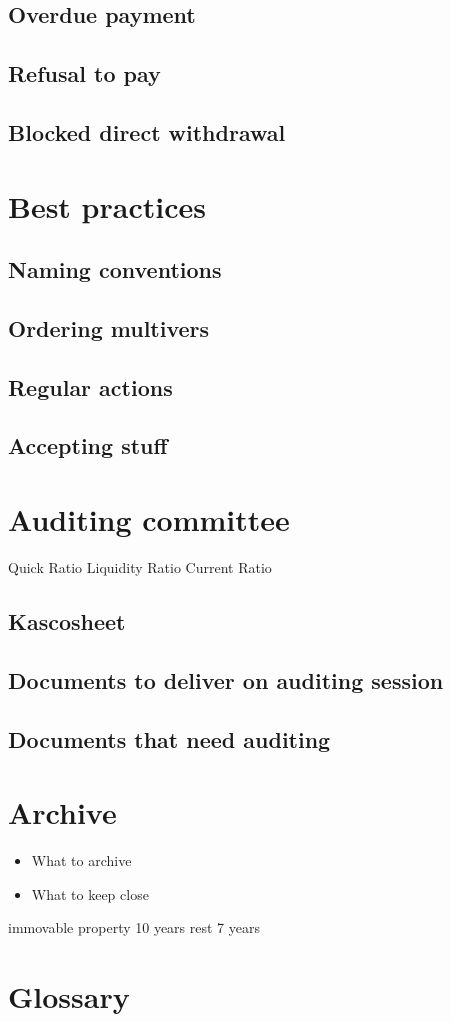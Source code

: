 \documentclass{report}
\begin{document}
\subsection{Overdue payment}
\subsection{Refusal to pay}
\subsection{Blocked direct withdrawal}
\section{Best practices}
\subsection{Naming conventions}
\subsection{Ordering multivers}
\subsection{Regular actions}
\subsection{Accepting stuff}
\section{Auditing committee}
Quick Ratio
Liquidity Ratio
Current Ratio
\subsection{Kascosheet}
\subsection{Documents to deliver on auditing session}
\subsection{Documents that need auditing}
\section{Archive}
\begin{itemize}
	\item What to archive
	\item What to keep close
\end{itemize}
immovable property 10 years
rest 7 years
\section{Glossary}
\end{document}
